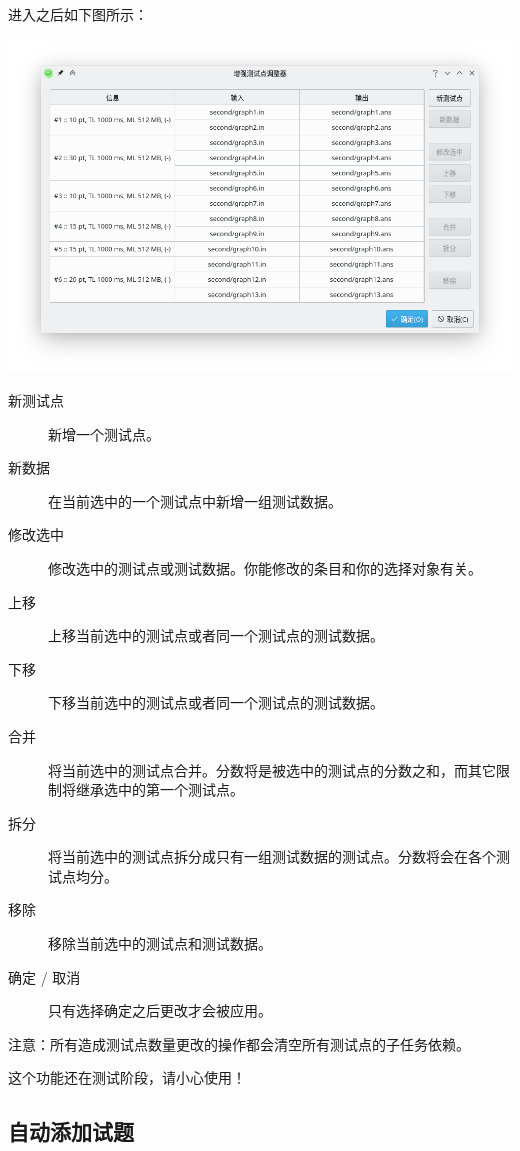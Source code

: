 \documentclass[UTF-8]{ctexart}
\begin{document}
			进入之后如下图所示：

			\begin{center}
			\includegraphics[scale=0.55]{pics/exttestcasemodifier.png}
			\end{center}

			\begin{description}
				\item[新测试点] 新增一个测试点。
				\item[新数据] 在当前选中的一个测试点中新增一组测试数据。
				\item[修改选中] 修改选中的测试点或测试数据。你能修改的条目和你的选择对象有关。
				\item[上移] 上移当前选中的测试点或者同一个测试点的测试数据。
				\item[下移] 下移当前选中的测试点或者同一个测试点的测试数据。
				\item[合并] 将当前选中的测试点合并。分数将是被选中的测试点的分数之和，而其它限制将继承选中的第一个测试点。
				\item[拆分] 将当前选中的测试点拆分成只有一组测试数据的测试点。分数将会在各个测试点均分。
				\item[移除] 移除当前选中的测试点和测试数据。
				\item[确定 / 取消] 只有选择确定之后更改才会被应用。
			\end{description}

			注意：所有造成测试点数量更改的操作都会清空所有测试点的子任务依赖。

			这个功能还在测试阶段，请小心使用！

		\subsection{自动添加试题}
\end{document}
